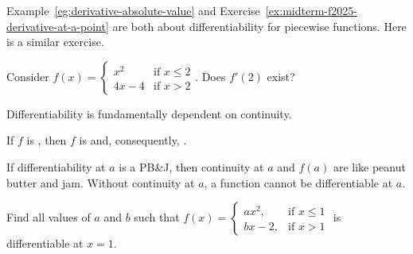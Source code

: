 \documentclass[../main.tex]{subfiles}
\begin{document}
Example~\ref{eg:derivative-absolute-value} and Exercise~\ref{ex:midterm-f2025-derivative-at-a-point} are both about differentiability for piecewise functions. Here is a similar exercise.

\begin{exercise} \label{ex:the-slingshot}
  Consider \(f(x) = \begin{cases} x^{2} &\text{if } x \le 2\\ 4x - 4& \text{if } x > 2 \end{cases}\). Does \(f'(2)\) exist?

  \blanks*
\end{exercise}
\clearpage

Differentiability is fundamentally dependent on continuity.
\begin{thm} \label{thm:differentiability-implies-continuity}
  If \(f\) is , then \(f\) is  and, consequently, .

  If differentiability at \(a\) is a PB\&J, then continuity at \(a\) and \(f(a)\) are like peanut butter and jam. Without continuity at \(a\), a function cannot be differentiable at \(a\).

\end{thm}

\begin{example} \label{eg:find-a-and-b-differentiability}
  Find all values of \(a\) and \(b\) such that
  \(
  f(x) =
  \begin{cases}
    a x^{2}, &\text{if } x \le 1 \\
    b x - 2,  &\text{if } x > 1
  \end{cases}
  \)
  is differentiable at \(x = 1\).

  \blanks*
\end{example}
\clearpage






\end{document}
